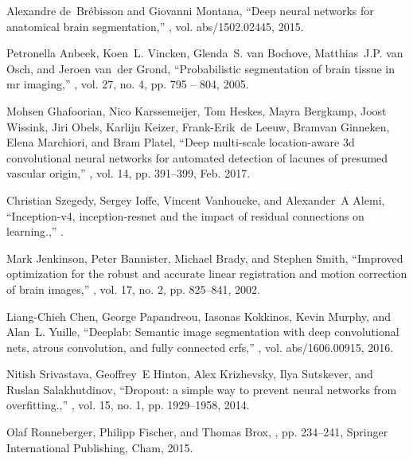 \documentclass{article}
\begin{document}
\begin{thebibliography}{10}
Alexandre de~Br{\'{e}}bisson and Giovanni Montana,
\newblock ``Deep neural networks for anatomical brain segmentation,''
, vol. abs/1502.02445, 2015.

Petronella Anbeek, Koen~L. Vincken, Glenda~S. van Bochove, Matthias~J.P. van
  Osch, and Jeroen van~der Grond,
\newblock ``Probabilistic segmentation of brain tissue in mr imaging,''
, vol. 27, no. 4, pp. 795 -- 804, 2005.

Mohsen Ghafoorian, Nico Karssemeijer, Tom Heskes, Mayra Bergkamp, Joost
  Wissink, Jiri Obels, Karlijn Keizer, Frank-Erik~de Leeuw, Bramvan Ginneken,
  Elena Marchiori, and Bram Platel,
\newblock ``Deep multi-scale location-aware 3d convolutional neural networks
  for automated detection of lacunes of presumed vascular origin,''
, vol. 14, pp. 391--399, Feb. 2017.

Christian Szegedy, Sergey Ioffe, Vincent Vanhoucke, and Alexander~A Alemi,
\newblock ``Inception-v4, inception-resnet and the impact of residual
  connections on learning.,''
.

Mark Jenkinson, Peter Bannister, Michael Brady, and Stephen Smith,
\newblock ``Improved optimization for the robust and accurate linear
  registration and motion correction of brain images,''
, vol. 17, no. 2, pp. 825--841, 2002.

Liang{-}Chieh Chen, George Papandreou, Iasonas Kokkinos, Kevin Murphy, and
  Alan~L. Yuille,
\newblock ``Deeplab: Semantic image segmentation with deep convolutional nets,
  atrous convolution, and fully connected crfs,''
, vol. abs/1606.00915, 2016.

Nitish Srivastava, Geoffrey~E Hinton, Alex Krizhevsky, Ilya Sutskever, and
  Ruslan Salakhutdinov,
\newblock ``Dropout: a simple way to prevent neural networks from
  overfitting.,''
, vol. 15, no. 1, pp.
  1929--1958, 2014.

Olaf Ronneberger, Philipp Fischer, and Thomas Brox,
, pp. 234--241,
\newblock Springer International Publishing, Cham, 2015.

\end{thebibliography}
\end{document}
